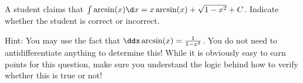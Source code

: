 \documentclass{ximera}
\author{Jim Talamo}
\begin{document}
\begin{exercise}
A student claims that $\int \arcsin(x) \d x = x \arcsin(x) + \sqrt{1-x^2}+C$.  Indicate whether the student is correct or incorrect. 

\begin{multipleChoice}  
\end{multipleChoice}

Hint: You may use the fact that $\ddx \arcsin(x) = \frac{1}{1-x^2}$.  You do not need to antidifferentiate anything to determine this!   While it is obviously easy to earn points for this question, make sure you understand the logic behind how to verify whether this is true or not!
\end{exercise}
\end{document}
